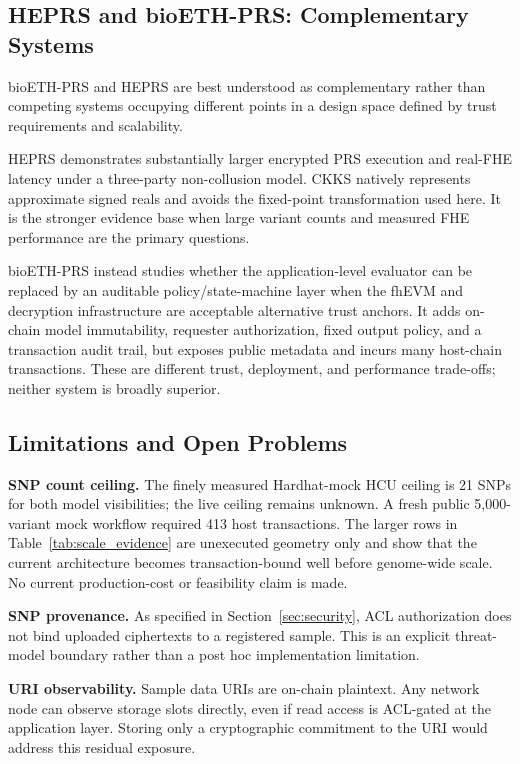 \documentclass[10pt,twocolumn]{article}
\begin{document}
\subsection{HEPRS and bioETH-PRS: Complementary Systems}

bioETH-PRS and HEPRS \citep{knight2026heprs} are best understood as complementary
rather than competing systems occupying different points in a design space defined
by trust requirements and scalability.

HEPRS demonstrates substantially larger encrypted PRS execution and real-FHE latency
under a three-party non-collusion model.  CKKS natively represents approximate signed
reals and avoids the fixed-point transformation used here.  It is the stronger evidence
base when large variant counts and measured FHE performance are the primary questions.

bioETH-PRS instead studies whether the application-level evaluator can be replaced by
an auditable policy/state-machine layer when the fhEVM and decryption infrastructure are
acceptable alternative trust anchors.  It adds on-chain model immutability, requester
authorization, fixed output policy, and a transaction audit trail, but exposes public
metadata and incurs many host-chain transactions.  These are different trust,
deployment, and performance trade-offs; neither system is broadly superior.

\subsection{Limitations and Open Problems}

\textbf{SNP count ceiling.}
The finely measured Hardhat-mock HCU ceiling is 21 SNPs for both model visibilities;
the live ceiling remains unknown.  A fresh public 5,000-variant mock workflow required
413 host transactions.  The larger rows in Table~\ref{tab:scale_evidence} are unexecuted
geometry only and show that the current architecture becomes transaction-bound well
before genome-wide scale.  No current production-cost or feasibility claim is made.

\textbf{SNP provenance.}
As specified in Section~\ref{sec:security}, ACL authorization does not bind uploaded
ciphertexts to a registered sample.  This is an explicit threat-model boundary rather
than a post hoc implementation limitation.

\textbf{URI observability.}
Sample data URIs are on-chain plaintext.  Any network node can observe storage
slots directly, even if read access is ACL-gated at the application layer.  Storing
only a cryptographic commitment to the URI would address this residual exposure.
\end{document}
